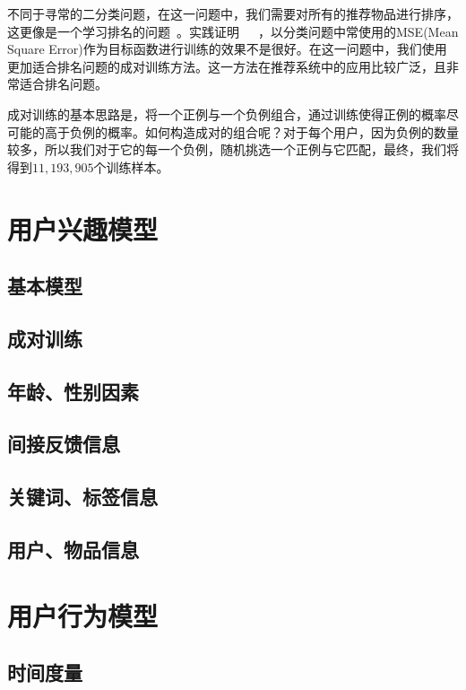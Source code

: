 \documentclass[12pt]{article} %
\begin{document}
\begin{sloppypar}
不同于寻常的二分类问题，在这一问题中，我们需要对所有的推荐物品进行排序，这更像是一个学习排名的问题~\cite{liu2009learning}。实践证明~\cite{furnkranz2003pairwise}~\cite{rendle2014improving}~\cite{sharma2013pairwise}，以分类问题中常使用的MSE(Mean Square Error)作为目标函数进行训练的效果不是很好。在这一问题中，我们使用更加适合排名问题的成对训练方法。这一方法在推荐系统中的应用比较广泛，且非常适合排名问题。

成对训练的基本思路是，将一个正例与一个负例组合，通过训练使得正例的概率尽可能的高于负例的概率。如何构造成对的组合呢？对于每个用户，因为负例的数量较多，所以我们对于它的每一个负例，随机挑选一个正例与它匹配，最终，我们将得到$11,193,905$个训练样本。


\newpage
\section{用户兴趣模型}

\subsection{基本模型}

\subsection{成对训练}

\subsection{年龄、性别因素}

\subsection{间接反馈信息}

\subsection{关键词、标签信息}

\subsection{用户、物品信息}


\newpage
\section{用户行为模型}

\subsection{时间度量}


\end{sloppypar}
\end{document}

